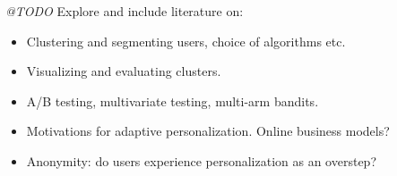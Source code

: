 \emph{@TODO} Explore and include literature on:

\begin{itemize}
  \item Clustering and segmenting users, choice of algorithms etc.
  \item Visualizing and evaluating clusters.
  \item A/B testing, multivariate testing, multi-arm bandits.
  \item Motivations for adaptive personalization. Online business models?
  \item Anonymity: do users experience personalization as an overstep?
\end{itemize}






